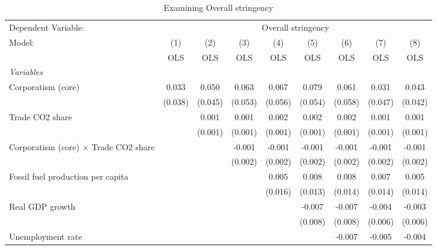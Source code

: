 
\begin{table}[htbp]
   \caption{Examining Overall stringency}
   \centering
   \begin{tabular}{lcccccccc}
      \toprule
      Dependent Variable: & \multicolumn{8}{c}{Overall stringency}\\
      Model:                                       & (1)     & (2)     & (3)     & (4)     & (5)     & (6)     & (7)     & (8)\\  
                                                   &  OLS    & OLS     & OLS     & OLS     & OLS     & OLS     & OLS     & OLS\\  
      \midrule
      \emph{Variables}\\
      Corporatism (core)                           & 0.033   & 0.050   & 0.063   & 0.067   & 0.079   & 0.061   & 0.031   & 0.043\\   
                                                   & (0.038) & (0.045) & (0.053) & (0.056) & (0.054) & (0.058) & (0.047) & (0.042)\\   
      Trade CO2 share                              &         & 0.001   & 0.001   & 0.002   & 0.002   & 0.002   & 0.001   & 0.001\\   
                                                   &         & (0.001) & (0.001) & (0.001) & (0.001) & (0.001) & (0.001) & (0.001)\\   
      Corporatism (core) $\times$ Trade CO2 share  &         &         & -0.001  & -0.001  & -0.001  & -0.001  & -0.001  & -0.001\\   
                                                   &         &         & (0.002) & (0.002) & (0.002) & (0.002) & (0.002) & (0.002)\\   
      Fossil fuel production per capita            &         &         &         & 0.005   & 0.008   & 0.008   & 0.007   & 0.005\\   
                                                   &         &         &         & (0.016) & (0.013) & (0.014) & (0.014) & (0.014)\\   
      Real GDP growth                              &         &         &         &         & -0.007  & -0.007  & -0.004  & -0.003\\   
                                                   &         &         &         &         & (0.008) & (0.008) & (0.006) & (0.006)\\   
      Unemployment rate                            &         &         &         &         &         & -0.007  & -0.005  & -0.004\\   

\end{tabular}
\end{table}
